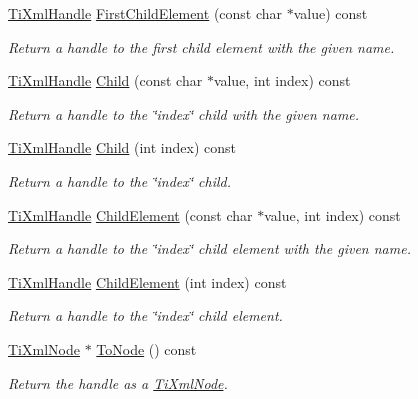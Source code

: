 \begin{DoxyCompactItemize}
\hyperlink{classTiXmlHandle}{TiXmlHandle} \hyperlink{classTiXmlHandle_af0aea751320f5e430fac6f8fff3b8dd4}{FirstChildElement} (const char $\ast$value) const 
\begin{DoxyCompactList}\small\item\em Return a handle to the first child element with the given name. \item\end{DoxyCompactList}\item 
\hyperlink{classTiXmlHandle}{TiXmlHandle} \hyperlink{classTiXmlHandle_a072492b4be1acdb0db2d03cd8f71ccc4}{Child} (const char $\ast$value, int index) const 
\begin{DoxyCompactList}\small\item\em Return a handle to the \char`\"{}index\char`\"{} child with the given name. \item\end{DoxyCompactList}\item 
\hyperlink{classTiXmlHandle}{TiXmlHandle} \hyperlink{classTiXmlHandle_af9cf6a7d08a5da94a8924425ad0cd5ac}{Child} (int index) const 
\begin{DoxyCompactList}\small\item\em Return a handle to the \char`\"{}index\char`\"{} child. \item\end{DoxyCompactList}\item 
\hyperlink{classTiXmlHandle}{TiXmlHandle} \hyperlink{classTiXmlHandle_a979a3f850984a176ee884e394c7eed2d}{ChildElement} (const char $\ast$value, int index) const 
\begin{DoxyCompactList}\small\item\em Return a handle to the \char`\"{}index\char`\"{} child element with the given name. \item\end{DoxyCompactList}\item 
\hyperlink{classTiXmlHandle}{TiXmlHandle} \hyperlink{classTiXmlHandle_a8786475b9d1f1518492e3a46704c7ef0}{ChildElement} (int index) const 
\begin{DoxyCompactList}\small\item\em Return a handle to the \char`\"{}index\char`\"{} child element. \item\end{DoxyCompactList}\item 
\hyperlink{classTiXmlNode}{TiXmlNode} $\ast$ \hyperlink{classTiXmlHandle_af678e5088e83be67baf76f699756f2c3}{ToNode} () const 
\begin{DoxyCompactList}\small\item\em Return the handle as a \hyperlink{classTiXmlNode}{TiXmlNode}. \item\end{DoxyCompactList}\item 

\end{DoxyCompactItemize}
